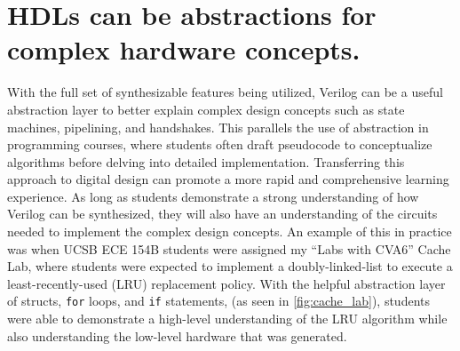 \FloatBarrier

\section{HDLs can be abstractions for complex hardware concepts.}

With the full set of synthesizable features being utilized, Verilog can be a useful abstraction layer to better explain complex design concepts such as state machines, pipelining, and handshakes. This parallels the use of abstraction in programming courses, where students often draft pseudocode to conceptualize algorithms before delving into detailed implementation. Transferring this approach to digital design can promote a more rapid and comprehensive learning experience. As long as students demonstrate a strong understanding of how Verilog can be synthesized, they will also have an understanding of the circuits needed to implement the complex design concepts. An example of this in practice was when UCSB ECE 154B students were assigned my \enquote{Labs with CVA6} Cache Lab, where students were expected to implement a doubly-linked-list to execute a least-recently-used (LRU) replacement policy. With the helpful abstraction layer of structs, \texttt{for} loops, and \texttt{if} statements, (as seen in \autoref{fig:cache_lab}), students were able to demonstrate a high-level understanding of the LRU algorithm while also understanding the low-level hardware that was generated.
